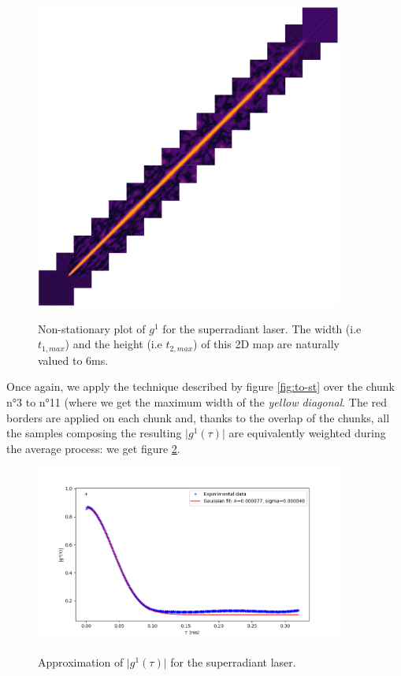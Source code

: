 \documentclass[10pt]{report}
\begin{document}
\begin{figure}[h!]
\caption{Non-stationary plot of $g^1$ for the superradiant laser. The width (i.e $t_{1, max}$) and the height (i.e $t_{2, max}$) of this 2D map are naturally valued to 6ms.}
\centering
\includegraphics[width=0.9\textwidth]{medley}
\label{fig:medley}
\end{figure}

Once again, we apply the technique described by figure \ref{fig:to-st} over the chunk n°3 to n°11 (where we get the maximum width of the \textit{yellow diagonal}. The red borders are applied on each chunk and, thanks to the overlap of the chunks, all the samples composing the resulting $\vert g^1(\tau) \vert$ are equivalently weighted during the average process: we get figure \ref{fig:sp-stat}.

\begin{figure}[h!]
\caption{Approximation of $\vert g^1(\tau) \vert$ for the superradiant laser.}
\centering
\includegraphics[width=0.9\textwidth]{sp-stat}
\label{fig:sp-stat}
\end{figure}
\end{document}
